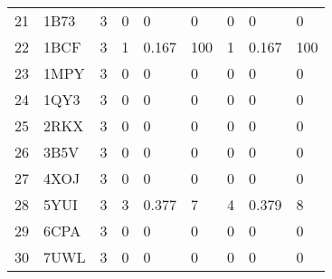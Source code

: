 \begin{table}[p]
{\begin{tabular}{|l|l|l|lll|lll|}
\hline \hline
21          & 1B73        & 3                 & 0                         & 0                & 0                     & 0                     & 0                & 0                                 \\
22          & 1BCF        & 3                 & 1                         & 0.167            & 100                   & 1                     & 0.167            & 100                               \\
23          & 1MPY        & 3                 & 0                         & 0                & 0                     & 0                     & 0                & 0                                 \\
24          & 1QY3        & 3                 & 0                         & 0                & 0                     & 0                     & 0                & 0                                 \\
25          & 2RKX        & 3                 & 0                         & 0                & 0                     & 0                     & 0                & 0                                 \\
26          & 3B5V        & 3                 & 0                         & 0                & 0                     & 0                     & 0                & 0                                 \\
27          & 4XOJ        & 3                 & 0                         & 0                & 0                     & 0                     & 0                & 0                                 \\
28          & 5YUI        & 3                 & 3                         & 0.377            & 7                     & 4                     & 0.379            & 8                                 \\
29          & 6CPA        & 3                 & 0                         & 0                & 0                     & 0                     & 0                & 0                                 \\
30          & 7UWL        & 3                 & 0                         & 0                & 0                     & 0                     & 0                & 0                                 \\ 
\hline
\end{tabular}
}
\end{table}


